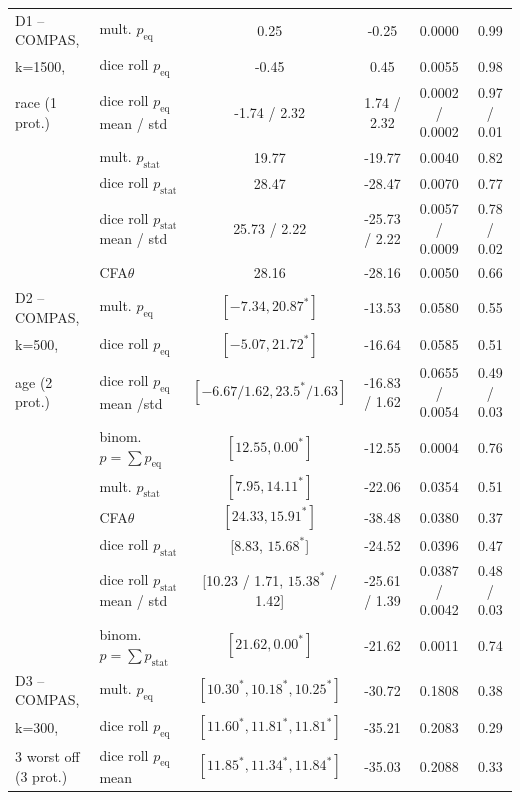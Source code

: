 \begin{table}[t!]
{\begin{tabular}{llcccc}
		\midrule
		\midrule
		D1 -- COMPAS,	& mult. \algoFAIR $p_{\text{eq}}$ 	& 0.25 	& -0.25 	& 0.0000	& 0.99\\
		k=1500,			& dice roll $p_{\text{eq}}$		& -0.45 & 0.45		& 0.0055 	& 0.98\\
		race (1 prot.)	& dice roll $p_{\text{eq}}$ mean / std	& -1.74 / 2.32 & 1.74 / 2.32		& 0.0002 / 0.0002 	& 0.97 / 0.01\\
						\cline{2-6}
						& mult. \algoFAIR $p_{\text{stat}}$	& 19.77 & -19.77 	& 0.0040 	& 0.82\\
						& dice roll $p_{\text{stat}}$	& 28.47 & -28.47	& 0.0070	& 0.77 \\
						& dice roll $p_{\text{stat}}$ mean / std	& 25.73 / 2.22 & -25.73 / 2.22	& 0.0057 / 0.0009	& 0.78 / 0.02 \\
						& CFA$\theta$ 					& 28.16 & -28.16	& 0.0050	& 0.66\\
		\midrule
		\midrule
		D2 -- COMPAS, 	& mult. \algoFAIR $p_{\text{eq}}$ 	& $[-7.34, 20.87^*]$ 	& -13.53 	& 0.0580 & 0.55 \\
		k=500,			& dice roll $p_{\text{eq}}$		& $[-5.07, 21.72^*]$ 	& -16.64	& 0.0585 & 0.51\\
		age (2 prot.)	& dice roll $p_{\text{eq}}$	mean /std	& $[-6.67 / 1.62, 23.5^* / 1.63]$ 	& -16.83 / 1.62	& 0.0655 / 0.0054 & 0.49 / 0.03\\
						& binom. \algoFAIR $p = \sum p_{\text{eq}}$	& $[12.55,0.00^*]$		& -12.55		& 0.0004 & 0.76 \\
						\cline{2-6}
						& mult. \algoFAIR $p_{\text{stat}}$ 	& $[7.95, 14.11^*]$ 	& -22.06 	& 0.0354 & 0.51 \\
						& CFA$\theta$ 					& $[24.33, 15.91^*]$ 	& -38.48	& 0.0380 & 0.37 \\ %
						& dice roll $p_{\text{stat}}$ & [8.83, $15.68^*$] 	& -24.52	& 0.0396 & 0.47 \\
						& dice roll $p_{\text{stat}}$	mean / std & [10.23 / 1.71, $15.38^*$ / 1.42] 	& -25.61 / 1.39	& 0.0387 / 0.0042 & 0.48 / 0.03 \\
						& binom. \algoFAIR $p = \sum p_{\text{stat}}$	& $[21.62, 0.00^*]$	& -21.62		& 0.0011 	& 0.74 \\													
		\midrule
		\midrule
		D3 -- COMPAS, 			& mult. \algoFAIR  $p_{\text{eq}}$ 	& $[10.30^*, 10.18^*, 10.25^*]$ & -30.72	& 0.1808 & 0.38 \\
		k=300, 					& dice roll $p_{\text{eq}}$		& $[11.60^*, 11.81^*, 11.81^*]$	& -35.21	& 0.2083 & 0.29\\
		3 worst off (3 prot.)	& dice roll $p_{\text{eq}}$ mean & $[11.85^*, 11.34^*, 11.84^*]$	& -35.03	& 0.2088 & 0.33\\

\end{tabular}}
\end{table}
